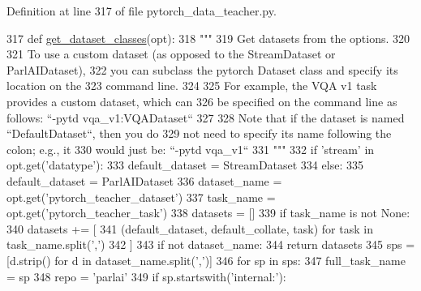 Definition at line 317 of file pytorch\+\_\+data\+\_\+teacher.\+py.


\begin{DoxyCode}
317 \textcolor{keyword}{def }\hyperlink{namespaceparlai_1_1core_1_1pytorch__data__teacher_acd56d9ac5d68831c1e91690f26eb2328}{get\_dataset\_classes}(opt):
318     \textcolor{stringliteral}{"""}
319 \textcolor{stringliteral}{    Get datasets from the options.}
320 \textcolor{stringliteral}{}
321 \textcolor{stringliteral}{    To use a custom dataset (as opposed to the StreamDataset or ParlAIDataset),}
322 \textcolor{stringliteral}{    you can subclass the pytorch Dataset class and specify its location on the}
323 \textcolor{stringliteral}{    command line.}
324 \textcolor{stringliteral}{}
325 \textcolor{stringliteral}{    For example, the VQA v1 task provides a custom dataset, which can}
326 \textcolor{stringliteral}{    be specified on the command line as follows: ``-pytd vqa\_v1:VQADataset``}
327 \textcolor{stringliteral}{}
328 \textcolor{stringliteral}{    Note that if the dataset is named ``DefaultDataset``, then you do}
329 \textcolor{stringliteral}{    not need to specify its name following the colon; e.g., it}
330 \textcolor{stringliteral}{    would just be: ``-pytd vqa\_v1``}
331 \textcolor{stringliteral}{    """}
332     \textcolor{keywordflow}{if} \textcolor{stringliteral}{'stream'} \textcolor{keywordflow}{in} opt.get(\textcolor{stringliteral}{'datatype'}):
333         default\_dataset = StreamDataset
334     \textcolor{keywordflow}{else}:
335         default\_dataset = ParlAIDataset
336     dataset\_name = opt.get(\textcolor{stringliteral}{'pytorch\_teacher\_dataset'})
337     task\_name = opt.get(\textcolor{stringliteral}{'pytorch\_teacher\_task'})
338     datasets = []
339     \textcolor{keywordflow}{if} task\_name \textcolor{keywordflow}{is} \textcolor{keywordflow}{not} \textcolor{keywordtype}{None}:
340         datasets += [
341             (default\_dataset, default\_collate, task) \textcolor{keywordflow}{for} task \textcolor{keywordflow}{in} task\_name.split(\textcolor{stringliteral}{','})
342         ]
343     \textcolor{keywordflow}{if} \textcolor{keywordflow}{not} dataset\_name:
344         \textcolor{keywordflow}{return} datasets
345     sps = [d.strip() \textcolor{keywordflow}{for} d \textcolor{keywordflow}{in} dataset\_name.split(\textcolor{stringliteral}{','})]
346     \textcolor{keywordflow}{for} sp \textcolor{keywordflow}{in} sps:
347         full\_task\_name = sp
348         repo = \textcolor{stringliteral}{'parlai'}
349         \textcolor{keywordflow}{if} sp.startswith(\textcolor{stringliteral}{'internal:'}):

\end{DoxyCode}
